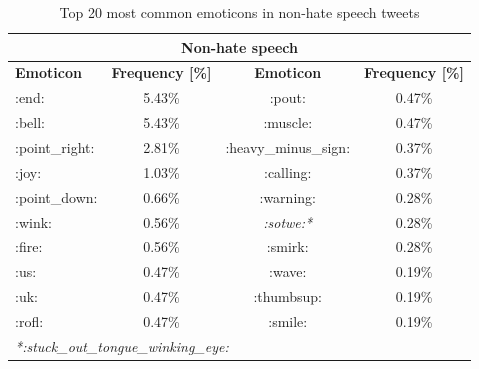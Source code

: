 \documentclass[conference]{IEEEtran}
\begin{document}
\begin{table}[!ht]
    \def\arraystretch{1.2}%
    \begin{center}
      \caption{Top 20 most common emoticons in non-hate speech tweets}
      \label{tab:emoticons_non_hate}
      \begin{tabular}{l c | c c}
        \hline\hline
        \multicolumn{4}{c}{\textbf{Non-hate speech}}\\
        \hline
        \textbf{Emoticon}&\textbf{Frequency [\%]}&\textbf{Emoticon}&\textbf{Frequency [\%]}\\
        \hline
        :end: & 5.43\% & :pout: & 0.47\%\\
        :bell: & 5.43\% & :muscle: & 0.47\%\\
        :point\_right: & 2.81\% & :heavy\_minus\_sign: & 0.37\%\\
        :joy: & 1.03\% & :calling: & 0.37\%\\
        :point\_down: & 0.66\% & :warning: & 0.28\%\\
        :wink: & 0.56\% & \emph{:sotwe:*} & 0.28\%\\
        :fire: & 0.56\% & :smirk: & 0.28\%\\
        :us: & 0.47\% & :wave: & 0.19\%\\
        :uk: & 0.47\% & :thumbsup: & 0.19\%\\
        :rofl: & 0.47\% & :smile: & 0.19\%\\                           
        \hline
        \multicolumn{4}{l}{\emph{*:stuck\_out\_tongue\_winking\_eye:}}\\
        \hline\hline
      \end{tabular}  
    \end{center}
  \end{table}
\end{document}
